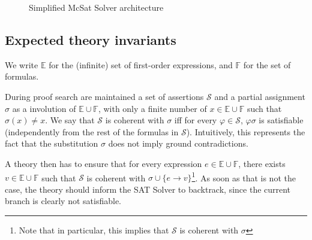 \begin{figure}
  \begin{center}
  \end{center}
  \caption{Simplified McSat Solver architecture}\label{fig:mcsat_flow}
\end{figure}

\subsection{Expected theory invariants}

We write $\mathbb{E}$ for the (infinite) set of first-order expressions,
and $\mathbb{F}$ for the set of formulas.

During proof search are maintained a set of assertions $\mathcal{S}$
and a partial assignment $\sigma$ as a involution of $\mathbb{E} \cup \mathbb{F}$,
with only a finite number of $x \in \mathbb{E} \cup \mathbb{F}$ such that $\sigma(x) \neq x$.
We say that $\mathcal{S}$ is coherent with $\sigma$ iff for every $\varphi \in \mathcal{S}$,
$\varphi\sigma$ is satisfiable (independently from the rest of the formulas in $\mathcal{S}$).
Intuitively, this represents the fact that the substitution $\sigma$ does not imply
ground contradictions.

A theory then has to ensure that for every expression $e \in \mathbb{E} \cup \mathbb{F}$,
there exists $v \in \mathbb{E} \cup \mathbb{F}$ such that $\mathcal{S}$ is coherent with
$\sigma \cup \{ e \rightarrow v \}$\footnote{Note that in particular, this implies
that $\mathcal{S}$ is coherent with $\sigma$}. As soon as that is not the case, the theory
should inform the SAT Solver to backtrack, since the current branch is clearly not satisfiable.

